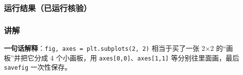 \begin{Shaded}
\begin{Highlighting}[]
\OperatorTok{=}\NormalTok{)}
\OperatorTok{=}\NormalTok{[}\NormalTok{, }\NormalTok{, }\NormalTok{, }\NormalTok{])}
\OperatorTok{=}\NormalTok{)}
\NormalTok{(}\NormalTok{))}
\NormalTok{(}\NormalTok{, }\OperatorTok{=}\NormalTok{))))}
\NormalTok{(}\NormalTok{)}
\end{Highlighting}
\end{Shaded}

\subsubsection{运行结果（已运行核验）}\label{ux8fd0ux884cux7ed3ux679cux5df2ux8fd0ux884cux6838ux9a8c-20}

\begin{Shaded}
\begin{Highlighting}[]
\end{Highlighting}
\end{Shaded}

\subsubsection{讲解}\label{ux8bb2ux89e3-20}

\textbf{一句话解释}：\texttt{fig,\ axes\ =\ plt.subplots(2,\ 2)}
相当于买了一张 2×2 的``画板''并把它分成 4 个小画板，用
\texttt{axes{[}0,0{]}}、\texttt{axes{[}1,1{]}} 等分别往里面画，最后
\texttt{savefig} 一次性保存。

